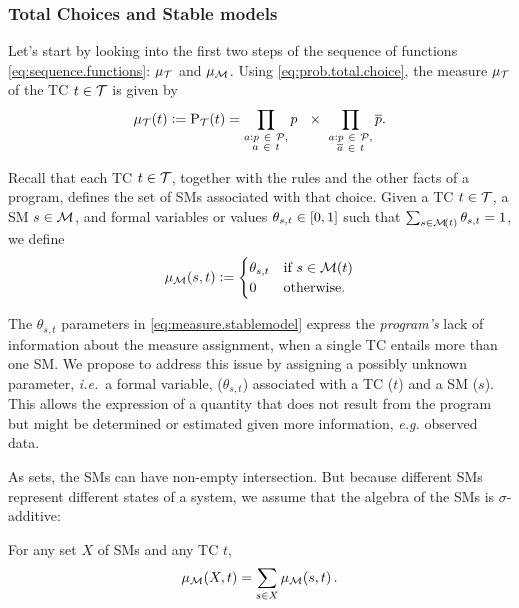 \documentclass[x11names]{tlp}
\begin{document}
\subsubsection*{Total Choices and Stable models}
\label{par:prop.totalchoices}

Let's start by looking into the first two steps of the sequence of functions
\cref{eq:sequence.functions}: $\pwT$ and $\pwM$. Using
\cref{eq:prob.total.choice}, the measure $\mu_{\cal T}$ of the \acl{TC} $t
	\in \TCHOICEset$ is given by
\begin{equation}
	\pwt{t} := \prT\at{t}=
	\prod_{\substack{
			\probfact{a}{p}~ \in ~\PROBFset,%
	\\
			a~ \in~ t}} p\ \ \times\
	\prod_{\substack{
			\probfact{a}{p}~ \in ~\PROBFset,%
	\\
			\co{a}~\in~ t}} \co{p}.
	\label{eq:measure.tchoice}
\end{equation}

Recall that each \acl{TC} $t \in \TCHOICEset$, together with the rules and
the other facts of a program, defines the set \tcgen{t} of \aclp{SM}
associated with that choice. Given a \acl{TC} $t \in \TCHOICEset$, a \acl{SM}
$s \in \MODELset $, and formal variables or values $\theta_{s,t} \in
	\intcc{0, 1}$ such that $\sum_{s\in \tcgen{t}} \theta_{s,t} = 1$, we define
\begin{equation}
	\pwm{s, t} := \begin{cases}
		              \theta_{s,t} & \text{if~} s \in \tcgen{t}\cr 0 & \text{otherwise.}
	              \end{cases}
	\label{eq:measure.stablemodel}
\end{equation}

The $\theta_{s,t}$ parameters in \cref{eq:measure.stablemodel} express the
\emph{program's} lack of information about the measure assignment, when a
single \acl{TC} entails more than one \acl{SM}. We propose to address this
issue by assigning a possibly unknown parameter, \textit{i.e.}~a formal
variable, ($\theta_{s,t}$) associated with a \acl{TC} ($t$) and a \acl{SM}
($s$). This allows the expression of a quantity that does not result from the
program but might be determined or estimated given more information,
\textit{e.g.} observed data.

As sets, the \aclp{SM} can have non-empty intersection. But because different
\acp{SM} represent different states of a system, we assume that the algebra
of the \aclp{SM} is $\sigma$-additive:

\begin{assumption}
	\label{assumption:smodels.disjoint}%

	For any set $X$ of \aclp{SM} and any \acl{TC} $t$,
	\begin{equation}
		\pwM\at{X, t} = \sum_{s\in X}\pwM\at{s, t}.\label{eq:smodels.disjoint}
	\end{equation}

\end{assumption}
\end{document}
